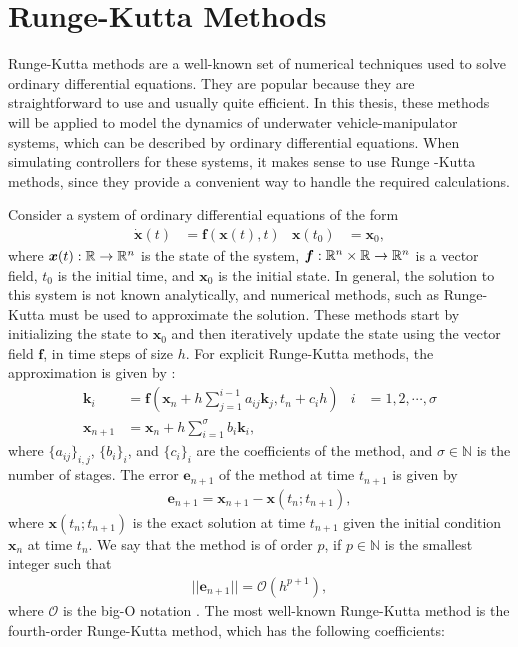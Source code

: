 \section{Runge-Kutta Methods}
\label{sec:runge-kutta}

Runge-Kutta methods are a well-known set of numerical techniques used to solve
ordinary differential equations. They are popular because they are
straightforward to use and usually quite efficient. In this thesis, these
methods will be applied to model the dynamics of underwater vehicle-manipulator
systems, which can be described by ordinary differential equations.
When simulating controllers for these systems, it makes sense to use Runge
-Kutta methods, since they provide a convenient way to handle the required
calculations.

Consider a system of ordinary differential equations of the form
\begin{align}
    \dot{\bm{x}}(t) &= \bm{f}(\bm{x}(t), t) & \bm{x}(t_0) &= \bm{x}_0,
\end{align}
where $\bm{x}(t) : \mathbb{R} \to \mathbb{R}^n$ is the state of the system,
$\bm{f} : \mathbb{R}^n \times \mathbb{R} \to \mathbb{R}^n$ is a vector field, $t_0$ is the initial time,
and $\bm{x}_0$ is the initial state. In general, the solution to this system is
not known analytically, and numerical methods, such as Runge-Kutta must be used
to approximate the solution. These methods start by initializing the state to
$\bm{x}_0$ and then iteratively update the state using the vector field $\bm{f}$,
in time steps of size $h$. For explicit Runge-Kutta methods, the approximation
is given by \cite{modsim}:
\begin{subequations}
    \begin{align}
        \bm{k}_i &= \bm{f}(\bm{x}_n + h \sum_{j=1}^{i-1} a_{ij}\bm{k}_j, t_n + c_i h) &
            i &= 1, 2, \cdots, \sigma \\
        \bm{x}_{n+1} &= \bm{x}_n + h \sum_{i=1}^{\sigma} b_i \bm{k}_i,
    \end{align}
\end{subequations}
where $\{a_{ij}\}_{i,j}$, $\{b_i\}_i$, and $\{c_i\}_i$ are the coefficients of
the method, and $\sigma \in \mathbb{N}$ is the number of stages. The error $\bm{e}_{n+1}$ of
the method at time $t_{n+1}$ is given by
\begin{align}
    \bm{e}_{n+1} = \bm{x}_{n+1} - \bm{x}(t_n;t_{n+1}),
\end{align}
where $\bm{x}(t_n;t_{n+1})$ is the exact solution at time $t_{n+1}$ given the
initial condition $\bm{x}_n$ at time $t_n$. We say that the method is of order
$p$, if $p \in \mathbb{N}$ is the smallest integer such that
\begin{align}
    ||\bm{e}_{n+1}|| = \mathcal{O}(h^{p+1}),
\end{align}
where $\mathcal{O}$ is the big-O notation \cite{modsim}.
The most well-known Runge-Kutta method is the fourth-order Runge-Kutta method,
which has the following coefficients:

